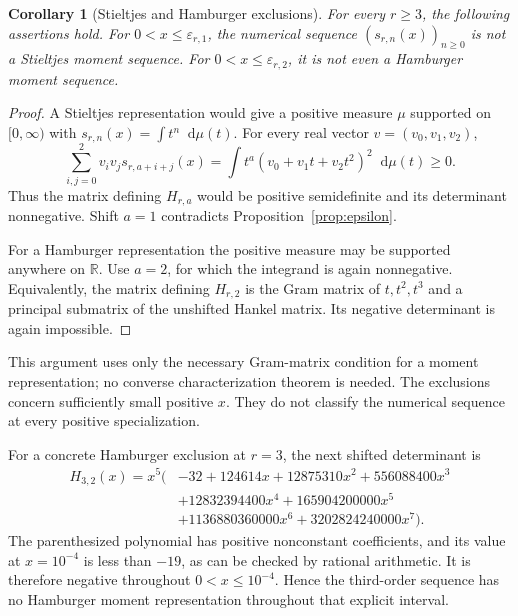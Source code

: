 \documentclass[11pt,a4paper]{article}
\newtheorem{corollary}[theorem]{Corollary}
\theoremstyle{definition}
\numberwithin{equation}{section}
\newcommand{\R}{\mathbb R}
\newcommand{\dd}{\mathop{}\!\mathrm{d}}
\begin{document}
\begin{corollary}[Stieltjes and Hamburger exclusions]
\label{cor:moments}
For every $r\ge3$, the following assertions hold.
For $0<x\le\varepsilon_{r,1}$, the numerical sequence
$(s_{r,n}(x))_{n\ge0}$ is not a Stieltjes moment sequence. For
$0<x\le\varepsilon_{r,2}$, it is not even a Hamburger moment sequence.
\end{corollary}
\begin{proof}
A Stieltjes representation would give a positive measure $\mu$ supported
on $[0,\infty)$ with
$s_{r,n}(x)=\int t^n\dd\mu(t)$. For every real vector
$v=(v_0,v_1,v_2)$,
\[
 \sum_{i,j=0}^2v_iv_j s_{r,a+i+j}(x)
  =\int t^a(v_0+v_1t+v_2t^2)^2\dd\mu(t)\ge0.
\]
Thus the matrix defining $H_{r,a}$ would be positive semidefinite and its
determinant nonnegative. Shift $a=1$ contradicts
Proposition~\ref{prop:epsilon}.

For a Hamburger representation the positive measure may be supported
anywhere on $\R$. Use $a=2$, for which the integrand is again
nonnegative. Equivalently, the matrix defining $H_{r,2}$ is the Gram
matrix of $t,t^2,t^3$ and a principal submatrix of the unshifted Hankel
matrix. Its negative determinant is again impossible.
\end{proof}

This argument uses only the necessary Gram-matrix condition for a
moment representation; no converse characterization theorem is needed.
The exclusions concern sufficiently small positive $x$. They do not
classify the numerical sequence at every positive specialization.

For a concrete Hamburger exclusion at $r=3$, the next shifted
determinant is
\begin{equation}
 \begin{split}
 H_{3,2}(x)=x^5\bigl(&-32+124614x+12875310x^2+556088400x^3\\
 &+12832394400x^4+165904200000x^5\\
 &+1136880360000x^6+3202824240000x^7\bigr).
 \end{split}
 \label{eq:H32}
\end{equation}
The parenthesized polynomial has positive nonconstant coefficients, and
its value at $x=10^{-4}$ is less than $-19$, as can be checked by rational
arithmetic. It is therefore negative throughout $0<x\le10^{-4}$.
Hence the third-order sequence has no Hamburger moment representation
throughout that explicit interval.
\end{document}
